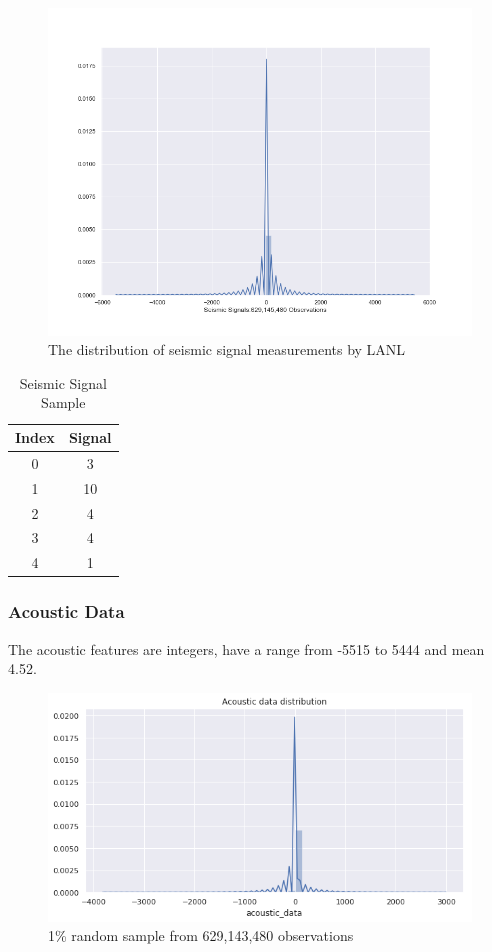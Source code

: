 \documentclass[]{llncs}
\begin{document}
\begin{figure}
	\centering
	\includegraphics[width=.8\linewidth]{../GPUProject/acousticRand60000DistPlot}
	\caption{The distribution of seismic signal measurements by LANL}
	\label{fig:acousticRand60000DistPlot}
\end{figure}

\begin{table}[h!]
	\begin{center}
		\caption{Seismic Signal Sample}
		\label{tab:table1}
		\begin{tabular}{c|c} %
			\textbf{Index} & \textbf{Signal}\\
			\hline
			0 & 3 \\
			1 & 10 \\ 
			2 & 4 \\
			3 & 4 \\
			4 & 1 \\
		\end{tabular}
	\end{center}
\end{table}

\subsubsection{Acoustic Data}
The acoustic features are integers, have a range from -5515 to 5444 and mean 4.52.
\begin{figure}[h]
	\centering
	\includegraphics[width=0.7\linewidth]{../GPUProject/acousticFeatureIntegers}
	\caption[]{1\% random sample from 629,143,480 observations}
	\label{fig:acousticfeatureintegers}
\end{figure}
\end{document}
